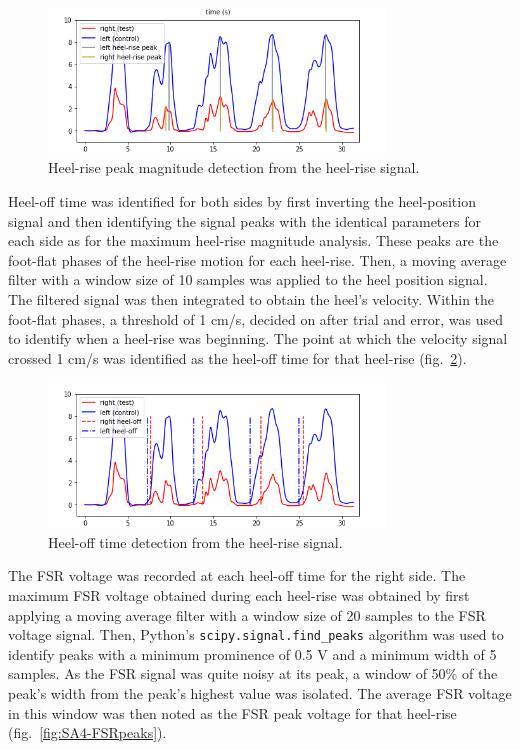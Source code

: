 \documentclass[defaultstyle,11pt]{thesis}
\begin{document}
\begin{figure}
\hypertarget{fig:SA4-heel_peak}{%
\centering
\includegraphics[width=0.8\textwidth,height=\textheight]{../fig/SA4/heel_peaks.png}
\caption{Heel-rise peak magnitude detection from the heel-rise signal.}\label{fig:SA4-heel_peak}
}
\end{figure}

Heel-off time was identified for both sides by first inverting the heel-position signal and then identifying the signal peaks with the identical parameters for each side as for the maximum heel-rise magnitude analysis.
These peaks are the foot-flat phases of the heel-rise motion for each heel-rise.
Then, a moving average filter with a window size of 10 samples was applied to the heel position signal.
The filtered signal was then integrated to obtain the heel's velocity.
Within the foot-flat phases, a threshold of 1 cm/s, decided on after trial and error, was used to identify when a heel-rise was beginning.
The point at which the velocity signal crossed 1 cm/s was identified as the heel-off time for that heel-rise (fig.~\ref{fig:SA4-heel_ho}).

\begin{figure}
\hypertarget{fig:SA4-heel_ho}{%
\centering
\includegraphics[width=0.8\textwidth,height=\textheight]{../fig/SA4/heel_ho.png}
\caption{Heel-off time detection from the heel-rise signal.}\label{fig:SA4-heel_ho}
}
\end{figure}

The FSR voltage was recorded at each heel-off time for the right side.
The maximum FSR voltage obtained during each heel-rise was obtained by first applying a moving average filter with a window size of 20 samples to the FSR voltage signal.
Then, Python's \texttt{scipy.signal.find\_peaks} algorithm was used to identify peaks with a minimum prominence of 0.5 V and a minimum width of 5 samples.
As the FSR signal was quite noisy at its peak, a window of 50\% of the peak's width from the peak's highest value was isolated.
The average FSR voltage in this window was then noted as the FSR peak voltage for that heel-rise (fig.~\ref{fig:SA4-FSRpeaks}).
\end{document}
